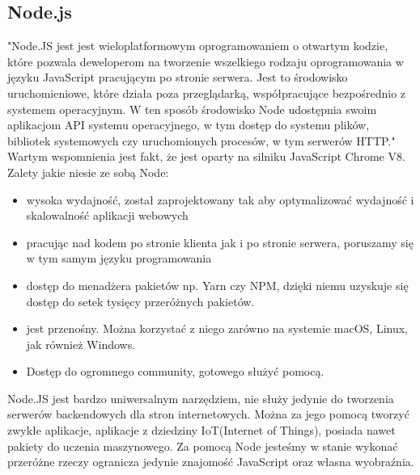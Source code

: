 \documentclass[12pt]{article}
\begin{document}
\begin{sloppypar}
{  \subsection{Node.js}
  {
    "Node.JS jest jest wieloplatformowym oprogramowaniem o otwartym kodzie, 
    które pozwala deweloperom na tworzenie wszelkiego rodzaju oprogramowania w języku JavaScript pracującym po stronie serwera. 
    Jest to środowisko uruchomieniowe, które działa poza przeglądarką, współpracujące bezpośrednio z systemem operacyjnym. 
    W ten sposób środowisko Node udostępnia swoim aplikacjom API systemu operacyjnego, w tym dostęp do systemu plików, bibliotek systemowych czy uruchomionych procesów, 
    w tym serwerów HTTP."\cite{mozilla-node} Wartym wspomnienia jest fakt, że jest oparty na silniku JavaScript Chrome V8.\\ 
    Zalety jakie niesie ze sobą Node:
    \begin{itemize}
      \item wysoka wydajność, został zaprojektowany tak aby optymalizować wydajność i skalowalność aplikacji webowych
      \item pracując nad kodem po stronie klienta jak i po stronie serwera, poruszamy się w tym samym języku programowania
      \item dostęp do menadżera pakietów np. Yarn czy NPM, dzięki niemu uzyskuje się dostęp do setek tysięcy przeróżnych pakietów.
      \item jest przenośny. Można korzystać z niego zarówno na systemie macOS, Linux, jak również Windows.
      \item Dostęp do ogromnego community, gotowego służyć pomocą.
    \end{itemize}
    Node.JS jest bardzo uniwersalnym narzędziem, nie służy jedynie do tworzenia serwerów backendowych dla stron internetowych. Można za jego pomocą tworzyć 
    zwykłe aplikacje, aplikacje z dziedziny IoT(Internet of Things), posiada nawet pakiety do uczenia maszynowego. Za pomocą Node jesteśmy w stanie 
    wykonać przeróżne rzeczy ogranicza jedynie znajomość JavaScript oraz własna wyobraźnia. \\
    \begin{figure}[H]
      \centering

\end{figure}}}
\end{sloppypar}
\end{document}
